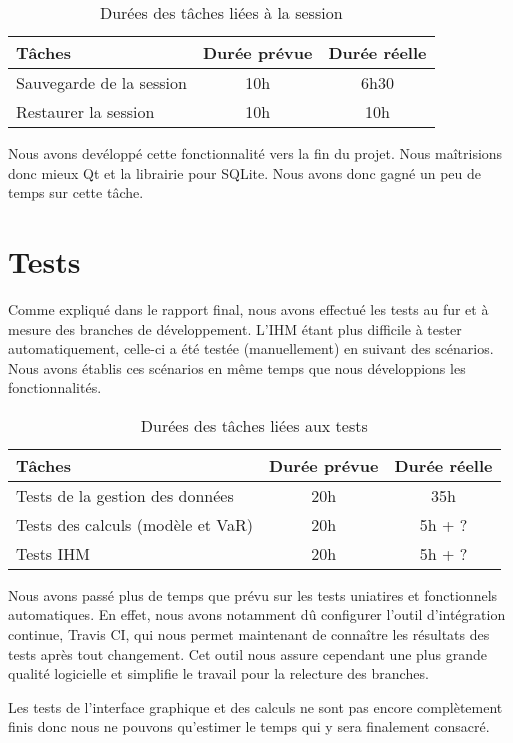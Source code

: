 \documentclass[a4paper]{report}
\begin{document}
\begin{table}[H]
\centering
  \begin{tabularx}{0.8\textwidth}{| X | c | c |}
    \hline
	Tâches & Durée prévue & Durée réelle \\
    \hline
    Sauvegarde de la session &  10h & 6h30\\
    Restaurer la session &  10h & 10h\\
    \hline
  \end{tabularx}
  \caption{Durées des tâches liées à la session}
\end{table}

Nous avons devéloppé cette fonctionnalité vers la fin du projet.
Nous maîtrisions donc mieux Qt et la librairie pour SQLite.
Nous avons donc gagné un peu de temps sur cette tâche.


\chapter{Tests}

Comme expliqué dans le rapport final, nous avons effectué les tests au fur et à mesure des branches de développement.
L'IHM étant plus difficile à tester automatiquement, celle-ci a été testée (manuellement) en suivant des scénarios.
Nous avons établis ces scénarios en même temps que nous développions les fonctionnalités.

\begin{table}[H]
\centering
  \begin{tabularx}{0.8\textwidth}{| X | c | c |}
    \hline
	Tâches & Durée prévue & Durée réelle \\
    \hline
    Tests de la gestion des données & 20h & 35h\\
    Tests des calculs (modèle et VaR) & 20h & 5h + ?\\
    Tests IHM & 20h & 5h + ?\\
    \hline
  \end{tabularx}
  \caption{Durées des tâches liées aux tests}
\end{table}

Nous avons passé plus de temps que prévu sur les tests uniatires et fonctionnels automatiques.
En effet, nous avons notamment dû configurer l'outil d'intégration continue, Travis CI, qui nous permet maintenant de connaître les résultats des tests après tout changement.
Cet outil nous assure cependant une plus grande qualité logicielle et simplifie le travail pour la relecture des branches.

Les tests de l'interface graphique et des calculs ne sont pas encore complètement finis donc nous ne pouvons qu'estimer le temps qui y sera finalement consacré.
\end{document}
